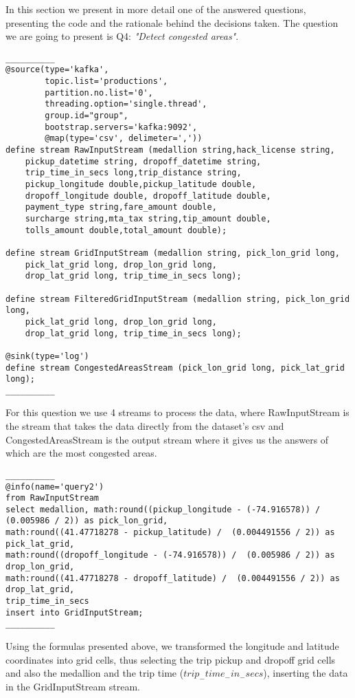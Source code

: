 In this section we present in more detail one of the answered questions, presenting the code and the rationale behind the decisions taken. The question we are going to present is Q4: \textit{"Detect congested areas"}.\par
\small
\begin{lstlisting}
__________
@source(type='kafka',
        topic.list='productions',
        partition.no.list='0',
        threading.option='single.thread',
        group.id="group",
        bootstrap.servers='kafka:9092',
        @map(type='csv', delimeter=','))
define stream RawInputStream (medallion string,hack_license string,
	pickup_datetime string, dropoff_datetime string,
	trip_time_in_secs long,trip_distance string,
	pickup_longitude double,pickup_latitude double,
	dropoff_longitude double, dropoff_latitude double,
	payment_type string,fare_amount double,
	surcharge string,mta_tax string,tip_amount double,
	tolls_amount double,total_amount double);

define stream GridInputStream (medallion string, pick_lon_grid long, 
	pick_lat_grid long, drop_lon_grid long, 
	drop_lat_grid long, trip_time_in_secs long);

define stream FilteredGridInputStream (medallion string, pick_lon_grid long, 
	pick_lat_grid long, drop_lon_grid long, 
	drop_lat_grid long, trip_time_in_secs long);

@sink(type='log')
define stream CongestedAreasStream (pick_lon_grid long, pick_lat_grid long);
__________
\end{lstlisting}

For this question we use 4 streams to process the data, where RawInputStream is the stream that takes the data directly from the dataset's csv and CongestedAreasStream is the output stream where it gives us the answers of which are the most congested areas.\par

\begin{lstlisting}
__________
@info(name='query2')
from RawInputStream
select medallion, math:round((pickup_longitude - (-74.916578)) /  (0.005986 / 2)) as pick_lon_grid, 
math:round((41.47718278 - pickup_latitude) /  (0.004491556 / 2)) as pick_lat_grid, 
math:round((dropoff_longitude - (-74.916578)) /  (0.005986 / 2)) as drop_lon_grid, 
math:round((41.47718278 - dropoff_latitude) /  (0.004491556 / 2)) as drop_lat_grid, 
trip_time_in_secs
insert into GridInputStream;
__________
\end{lstlisting}

Using the formulas presented above, we transformed the longitude and latitude coordinates into grid cells, thus selecting the trip pickup and dropoff grid cells and also the medallion and the trip time (\textit{$trip_-time_-in_-secs$}), inserting the data in the GridInputStream stream.

